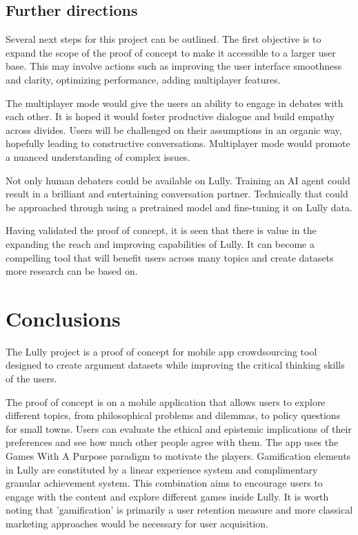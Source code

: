 \documentclass{report}
\begin{document}
\section{Further directions}
Several next steps for this project can be outlined. The first objective is to expand the scope of the proof of concept to make it accessible to a larger user base. This may involve actions such as improving the user interface smoothness and clarity, optimizing performance, adding multiplayer features.

The multiplayer mode would give the users an ability to engage in debates with each other. It is hoped it would foster productive dialogue and build empathy across divides.
Users will be challenged on their assumptions in an organic way, hopefully leading to constructive conversations. Multiplayer mode would promote a nuanced understanding of complex issues.

Not only human debaters could be available on Lully. Training an AI agent could result in a brilliant and entertaining conversation partner. Technically that could be approached through using a pretrained model and fine-tuning it on Lully data.

Having validated the proof of concept, it is seen that there is value in the expanding the reach and improving capabilities of Lully. It can become a compelling tool that will benefit users across many topics and create datasets more research can be based on.

\chapter{Conclusions}

The Lully project is a proof of concept for mobile app crowdsourcing tool designed to create argument datasets while improving the critical thinking skills of the users. 

The proof of concept is on a mobile application that allows users to explore different topics, from philosophical problems and dilemmas, to policy questions for small towns. Users can evaluate the ethical and epistemic implications of their preferences and see how much other people agree with them. The app uses the Games With A Purpose paradigm to motivate the players. Gamification elements in Lully are constituted by a linear experience system and complimentary granular achievement system. This combination aims to encourage users to engage with the content and explore different games inside Lully. It is worth noting that 'gamification' is primarily a user retention measure and more classical marketing approaches would be necessary for user acquisition.
\end{document}
